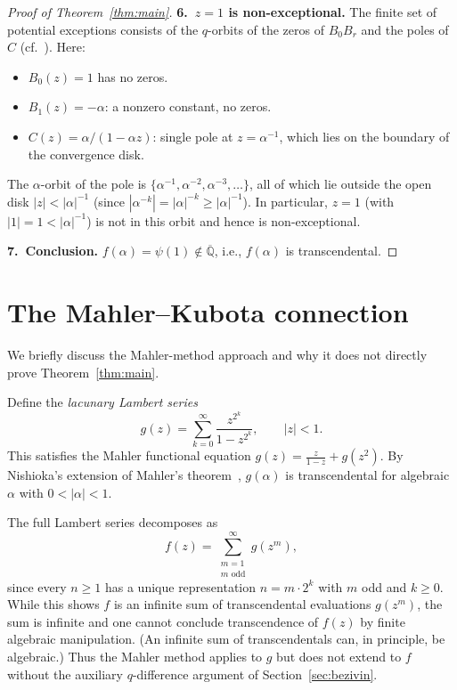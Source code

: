 \documentclass[12pt]{amsart}
\theoremstyle{definition}
\theoremstyle{remark}
\begin{document}
\begin{proof}[Proof of Theorem~\ref{thm:main}]
\medskip
\noindent\textbf{6.\ $z=1$ is non-exceptional.}
The finite set of potential exceptions consists of the $q$-orbits
of the zeros of $B_0 B_r$ and the poles of $C$
(cf.~\cite[Th\'eor\`eme~2]{bezivin}). Here:
\begin{itemize}
\item $B_0(z)=1$ has no zeros.
\item $B_1(z)=-\alpha$: a nonzero constant, no zeros.
\item $C(z)=\alpha/(1-\alpha z)$: single pole at $z=\alpha^{-1}$,
which lies on the boundary of the convergence disk.
\end{itemize}
The $\alpha$-orbit of the pole is
$\{\alpha^{-1},\alpha^{-2},\alpha^{-3},\ldots\}$, all of which lie
outside the open disk $|z|<|\alpha|^{-1}$ (since
$|\alpha^{-k}|=|\alpha|^{-k}\ge|\alpha|^{-1}$). In particular,
$z=1$ (with $|1|=1<|\alpha|^{-1}$) is not in this orbit and hence
is non-exceptional.

\medskip
\noindent\textbf{7.\ Conclusion.}
$f(\alpha)=\psi(1)\notin\overline{\mathbb{Q}}$, i.e., $f(\alpha)$
is transcendental.
\end{proof}

\section{The Mahler--Kubota connection}
\label{sec:mahler}

We briefly discuss the Mahler-method approach and why it does not
directly prove Theorem~\ref{thm:main}.

Define the \emph{lacunary Lambert series}
\[
  g(z) = \sum_{k=0}^{\infty}\frac{z^{2^k}}{1-z^{2^k}},
  \qquad |z|<1.
\]
This satisfies the Mahler functional equation
$g(z) = \frac{z}{1-z}+g(z^2)$. By Nishioka's extension of Mahler's
theorem~\cite{nishioka}, $g(\alpha)$ is transcendental for
algebraic $\alpha$ with $0<|\alpha|<1$.

The full Lambert series decomposes as
\begin{equation}\label{eq:decomp}
  f(z) = \sum_{\substack{m=1\\m\text{ odd}}}^{\infty} g(z^m),
\end{equation}
since every $n\ge 1$ has a unique representation $n=m\cdot 2^k$ with
$m$ odd and $k\ge 0$. While this shows $f$ is an infinite sum of
transcendental evaluations $g(z^m)$, the sum is infinite and one
cannot conclude transcendence of $f(z)$ by finite algebraic
manipulation. (An infinite sum of transcendentals can, in principle,
be algebraic.) Thus the Mahler method applies to $g$ but does not
extend to $f$ without the auxiliary $q$-difference argument of
Section~\ref{sec:bezivin}.
\end{document}

